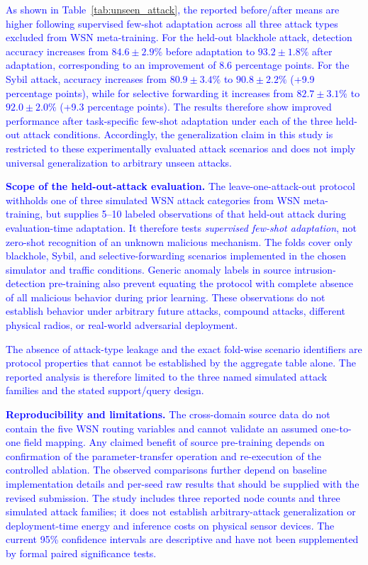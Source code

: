 \documentclass[pdflatex,sn-mathphys-num]{sn-jnl}
\newcommand{\Revised}[1]{\textcolor{blue}{#1}}
\begin{document}
\textcolor{blue}{As shown in
Table~\ref{tab:unseen_attack}, the reported before/after means are higher following supervised few-shot adaptation across all three attack types excluded from WSN meta-training. For the held-out blackhole attack,
detection accuracy increases from $84.6\pm2.9\%$ before adaptation to
$93.2\pm1.8\%$ after adaptation, corresponding to an improvement of
8.6 percentage points. For the Sybil attack, accuracy increases from
$80.9\pm3.4\%$ to $90.8\pm2.2\%$ (+9.9 percentage points), while for
selective forwarding it increases from $82.7\pm3.1\%$ to $92.0\pm2.0\%$
(+9.3 percentage points). The results therefore show improved performance
after task-specific few-shot adaptation under each of the three held-out
attack conditions. Accordingly, the generalization claim in this study is
restricted to these experimentally evaluated attack scenarios and does not
imply universal generalization to arbitrary unseen attacks.}


\textcolor{blue}{\textbf{Scope of the held-out-attack evaluation.} The leave-one-attack-out protocol withholds one of three simulated WSN attack categories from WSN meta-training, but supplies 5--10 labeled observations of that held-out attack during evaluation-time adaptation. It therefore tests \emph{supervised few-shot adaptation}, not zero-shot recognition of an unknown malicious mechanism. The folds cover only blackhole, Sybil, and selective-forwarding scenarios implemented in the chosen simulator and traffic conditions. Generic anomaly labels in source intrusion-detection pre-training also prevent equating the protocol with complete absence of all malicious behavior during prior learning. These observations do not establish behavior under arbitrary future attacks, compound attacks, different physical radios, or real-world adversarial deployment.}\par
\Revised{The absence of attack-type leakage and the exact fold-wise scenario identifiers are protocol properties that cannot be established by the aggregate table alone. The reported analysis is therefore limited to the three named simulated attack families and the stated support/query design.}\par
\textcolor{blue}{\textbf{Reproducibility and limitations.} The cross-domain source data do not contain the five WSN routing variables and cannot validate an assumed one-to-one field mapping. Any claimed benefit of source pre-training depends on confirmation of the parameter-transfer operation and re-execution of the controlled ablation. The observed comparisons further depend on baseline implementation details and per-seed raw results that should be supplied with the revised submission. The study includes three reported node counts and three simulated attack families; it does not establish arbitrary-attack generalization or deployment-time energy and inference costs on physical sensor devices. The current 95\% confidence intervals are descriptive and have not been supplemented by formal paired significance tests.}\par
\end{document}
